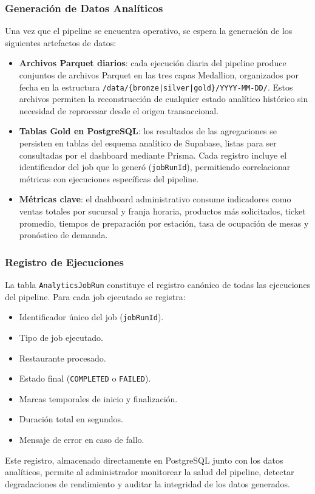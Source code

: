 \subsubsection{Generación de Datos Analíticos}

Una vez que el pipeline se encuentra operativo, se espera la generación
de los siguientes artefactos de datos:

\begin{itemize}[leftmargin=1.5em]
  \item \textbf{Archivos Parquet diarios}: cada ejecución diaria del
  pipeline produce conjuntos de archivos Parquet en las tres capas
  Medallion, organizados por fecha en la estructura
  \texttt{/data/\{bronze|silver|gold\}/YYYY-MM-DD/}. Estos archivos
  permiten la reconstrucción de cualquier estado analítico histórico
  sin necesidad de reprocesar desde el origen transaccional.
  \item \textbf{Tablas Gold en PostgreSQL}: los resultados de las
  agregaciones se persisten en tablas del esquema analítico de
  Supabase, listas para ser consultadas por el dashboard mediante
  Prisma. Cada registro incluye el identificador del job que lo generó
  (\texttt{jobRunId}), permitiendo correlacionar métricas con
  ejecuciones específicas del pipeline.
  \item \textbf{Métricas clave}: el dashboard administrativo consume
  indicadores como ventas totales por sucursal y franja horaria,
  productos más solicitados, ticket promedio, tiempos de preparación
  por estación, tasa de ocupación de mesas y pronóstico de demanda.
\end{itemize}

\subsubsection{Registro de Ejecuciones}

La tabla \texttt{AnalyticsJobRun} constituye el registro canónico de
todas las ejecuciones del pipeline. Para cada job ejecutado se registra:

\begin{itemize}[leftmargin=1.5em]
  \item Identificador único del job (\texttt{jobRunId}).
  \item Tipo de job ejecutado.
  \item Restaurante procesado.
  \item Estado final (\texttt{COMPLETED} o \texttt{FAILED}).
  \item Marcas temporales de inicio y finalización.
  \item Duración total en segundos.
  \item Mensaje de error en caso de fallo.
\end{itemize}

Este registro, almacenado directamente en PostgreSQL junto con los
datos analíticos, permite al administrador monitorear la salud del
pipeline, detectar degradaciones de rendimiento y auditar la integridad
de los datos generados.

\newpage
